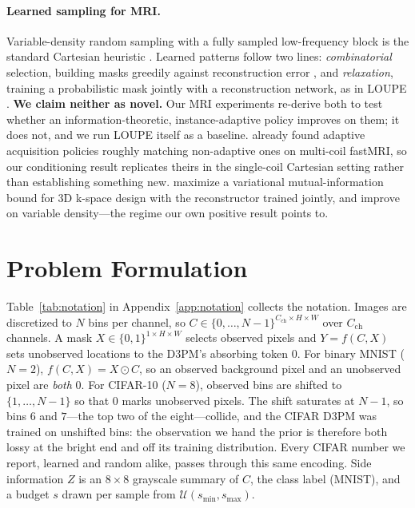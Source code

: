 \documentclass{article}
\begin{document}
\paragraph{Learned sampling for MRI.}
Variable-density random sampling with a fully sampled low-frequency block is the standard Cartesian heuristic \citep{lustig2007sparse}. Learned patterns follow two lines: \emph{combinatorial} selection, building masks greedily against reconstruction error \citep{gozcu2018learning}, and \emph{relaxation}, training a probabilistic mask jointly with a reconstruction network, as in LOUPE \citep{bahadir2020loupe}. \textbf{We claim neither as novel.} Our MRI experiments re-derive both to test whether an information-theoretic, instance-adaptive policy improves on them; it does not, and we run LOUPE itself as a baseline. \citet{bakker2022adaptive} already found adaptive acquisition policies roughly matching non-adaptive ones on multi-coil fastMRI, so our conditioning result replicates theirs in the single-coil Cartesian setting rather than establishing something new. \citet{alkan2025autosamp} maximize a variational mutual-information bound for 3D k-space design with the reconstructor trained jointly, and improve on variable density---the regime our own positive result points to.

\section{Problem Formulation}

Table~\ref{tab:notation} in Appendix~\ref{app:notation} collects the notation. Images are discretized to $N$ bins per channel, so $C \in \{0,\ldots,N-1\}^{C_{\mathrm{ch}} \times H \times W}$ over $C_{\mathrm{ch}}$ channels. A mask $X \in \{0,1\}^{1 \times H \times W}$ selects observed pixels and $Y = f(C, X)$ sets unobserved locations to the D3PM's absorbing token $0$. For binary MNIST ($N{=}2$), $f(C,X) = X \odot C$, so an observed background pixel and an unobserved pixel are \emph{both} $0$. For CIFAR-10 ($N{=}8$), observed bins are shifted to $\{1,\ldots,N{-}1\}$ so that $0$ marks unobserved pixels. The shift saturates at $N{-}1$, so bins $6$ and $7$---the top two of the eight---collide, and the CIFAR D3PM was trained on unshifted bins: the observation we hand the prior is therefore both lossy at the bright end and off its training distribution. Every CIFAR number we report, learned and random alike, passes through this same encoding. Side information $Z$ is an $8 \times 8$ grayscale summary of $C$, the class label (MNIST), and a budget $s$ drawn per sample from $\mathcal{U}(s_{\min}, s_{\max})$.
\end{document}
